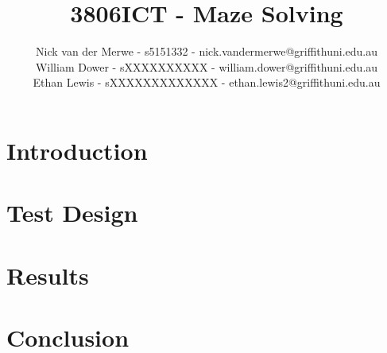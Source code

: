 \documentclass{article}
\title{3806ICT - Maze Solving}
\author{Nick van der Merwe - s5151332 - nick.vandermerwe@griffithuni.edu.au \\
    William Dower - sXXXXXXXXXX - william.dower@griffithuni.edu.au \\
    Ethan Lewis - sXXXXXXXXXXXXX - ethan.lewis2@griffithuni.edu.au}
\begin{document}
    \maketitle



    \section{Introduction}\label{sec:introduction}


    \section{Test Design}\label{sec:test-design}


    \section{Results}\label{sec:results}


    \section{Conclusion}\label{sec:conclusion}


    
    
\end{document}
